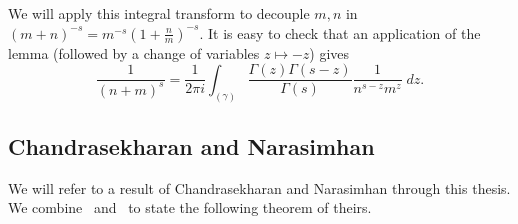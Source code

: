 We will apply this integral transform to decouple $m,n$ in $(m+n)^{-s} = m^{-s} (1 +
\tfrac{n}{m})^{-s}$.
It is easy to check that an application of the lemma (followed by a change of variables $z
\mapsto -z$) gives
\begin{equation}
  \frac{1}{(n+m)^s} = \frac{1}{2\pi i} \int_{(\gamma)}
  \frac{\Gamma(z)\Gamma(s-z)}{\Gamma(s)} \frac{1}{n^{s-z} m^z} \; dz.
\end{equation}



\subsection{Chandrasekharan and Narasimhan}\label{ssec:CN}


We will refer to a result of Chandrasekharan and Narasimhan through this thesis.
We combine~\cite[Theorem~4.1]{chandrasekharan1962functional}
and~\cite[Theorem~1]{chandrasekharan1964mean} to state the following
theorem of theirs.


